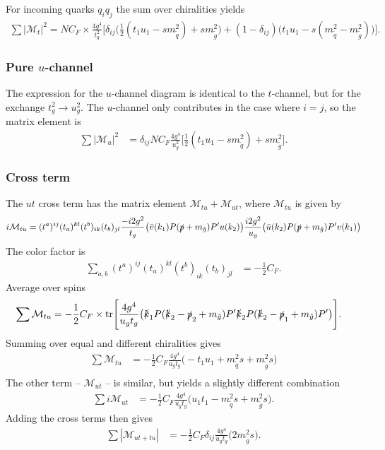 \documentclass[twoside,english]{uiofysmaster}
\begin{document}
For incoming quarks $q_iq_j$ the sum over chiralities  yields
\begin{align*}
\sum |\mathcal{M}_t|^2 =  NC_F  \times\frac{4 g^4}{t_g^2} \Big[\delta_{ij} \big(\frac{1}{2}(t_1u_1 -sm_{\tilde{q}}^2)+  sm_{\tilde{g}}^2 \big) + (1-\delta_{ij})\big(t_1u_1 -s(m_{\tilde{q}}^2- m_{\tilde{g}}^2) \big)\Big].
\end{align*}

\subsubsection{Pure $u$-channel}

The expression for the $u$-channel diagram is identical to the $t$-channel, but for the exchange $t_g^2 \rightarrow u_g^2$. The $u$-channel only contributes in the case where $i =j$, so the matrix element is
\begin{align*}
\sum |\mathcal{M}_u|^2 &= \delta_{ij} NC_F \frac{4g^4}{u_g^2} \Big[ \frac{1}{2}(t_1u_1-sm_{\tilde{q}}^2) + sm_{\tilde{g}}^2 \Big]. 
\end{align*}


\subsubsection{Cross term}
The $ut$ cross term has the matrix element $\mathcal{M}_{tu}+ \mathcal{M}_{ut}$, where $\mathcal{M}_{tu}$ is given by
\begin{align*}
i \mathcal{M}_{tu} &= (t^a)^{ij}(t_a)^{kl}(t^b)_{ik}(t_b)_{jl} \frac{-i 2 g^2}{t_g}\big( \bar{v} (k_1)  P (\slashed{p} + m_{\tilde{g}}) P'u(k_2) \big)  \frac{i 2 g^2}{u_g} \big( \bar{u} (k_2)  P (\slashed{p} + m_{\tilde{g}}) P' v(k_1) \big)\\
\end{align*}
The color factor is
\begin{align*}
\sum_{a,b}(t^a)^{ij}(t_a)^{kl}(t^b)_{ik}(t_b)_{jl} 
 &= - \frac{1}{2}C_F.
\end{align*}
Average over spins
\begin{align*}
\sum \mathcal{M}_{tu} &= - \frac{1}{2}C_F \times \text{tr}\Bigg[ \frac{4 g^4}{u_gt_g}\big( \slashed{k}_1   P (\slashed{k}_2 - \slashed{p}_2 + m_{\tilde{g}}) P'\slashed{k}_2  P (\slashed{k}_2 -\slashed{p}_1 + m_{\tilde{g}}) P' \big) \Bigg].
\end{align*}
Summing over equal and different chiralities gives
\begin{align*}
\sum  \mathcal{M}_{tu} 
  &= - \frac{1}{2}C_F  \frac{4 g^4}{u_gt_g} \big(
  -   t_1 u_1 + m_{\tilde{q}}^2 s 
+  m_{\tilde{g}}^2 s
  \big)\\
\end{align*}
The other term --  $\mathcal{M}_{ut}$ -- is similar, but yields a slightly different combination
\begin{align*}
\sum i \mathcal{M}_{ut} 
  &= - \frac{1}{2}C_F  \frac{4 g^4}{u_gt_g} \big(
u_1t_1- m_{\tilde{q}}^2s + m_{\tilde{g}}^2s
  \big).
\end{align*}
Adding the cross terms then gives 
\begin{align*}
\sum |\mathcal{M}_{ut+tu}| &= - \frac{1}{2}C_F \delta_{ij}  \frac{4 g^4}{u_gt_g} \big(2 m_{\tilde{g}}^2s   \big).
\end{align*}
\end{document}
